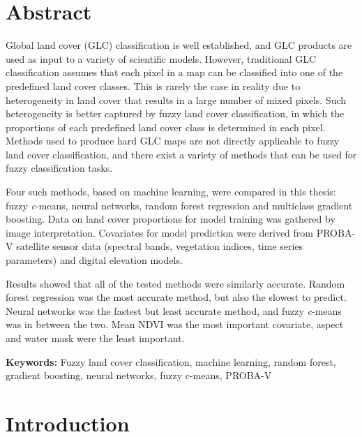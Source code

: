 \documentclass[a4paper,12pt]{scrbook}
\begin{document}
\chapter*{Abstract}

Global land cover (GLC) classification is well established, and GLC products are used as input to a variety of scientific models. However, traditional GLC classification assumes that each pixel in a map can be classified into one of the predefined land cover classes. This is rarely the case in reality due to heterogeneity in land cover that results in a large number of mixed pixels. Such heterogeneity is better captured by fuzzy land cover classification, in which the proportions of each predefined land cover class is determined in each pixel. Methods used to produce hard GLC maps are not directly applicable to fuzzy land cover classification, and there exist a variety of methods that can be used for fuzzy classification tasks.

Four such methods, based on machine learning, were compared in this thesis: fuzzy \textit{c}-means, neural networks, random forest regression and multiclass gradient boosting. Data on land cover proportions for model training was gathered by image interpretation. Covariates for model prediction were derived from PROBA-V satellite sensor data (spectral bands, vegetation indices, time series parameters) and digital elevation models.

Results showed that all of the tested methods were similarly accurate. Random forest regression was the most accurate method, but also the slowest to predict. Neural networks was the fastest but least accurate method, and fuzzy \textit{c}-means was in between the two. Mean NDVI was the most important covariate, aspect and water mask were the least important.

\textbf{Keywords:} Fuzzy land cover classification, machine learning, random forest, gradient boosting, neural networks, fuzzy c-means, PROBA-V


\setcounter{page}{3}

\tableofcontents

\chapter{Introduction}
\end{document}
